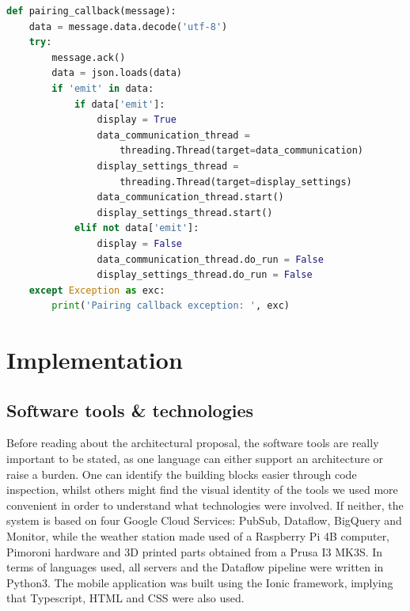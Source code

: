 \begin{lstlisting}[language=Python, caption=IoT Data Sensing Layer: 2 (Light display execution sequence; runs until the thread is canceled)]
def pairing_callback(message):
    data = message.data.decode('utf-8')
    try:
        message.ack()
        data = json.loads(data)
        if 'emit' in data:
            if data['emit']:
                display = True
                data_communication_thread = 
                    threading.Thread(target=data_communication)
                display_settings_thread = 
                    threading.Thread(target=display_settings)
                data_communication_thread.start()
                display_settings_thread.start()
            elif not data['emit']:
                display = False
                data_communication_thread.do_run = False
                display_settings_thread.do_run = False
    except Exception as exc:
        print('Pairing callback exception: ', exc)
\end{lstlisting}

\section{Implementation}

\subsection*{Software tools \& technologies}

Before reading about the architectural proposal, the software tools are really important to be stated, as one language can either support an architecture or raise a burden. One can identify the building blocks easier through code inspection, whilst others might find the visual identity of the tools we used more convenient in order to understand what technologies were involved. If neither, the system is based on four Google Cloud Services: PubSub, Dataflow, BigQuery and Monitor, while the weather station made used of a Raspberry Pi 4B computer, Pimoroni hardware and 3D printed parts obtained from a Prusa I3 MK3S. In terms of languages used, all servers and the Dataflow pipeline were written in Python3. The mobile application was built using the Ionic framework, implying that Typescript, HTML and CSS were also used.

